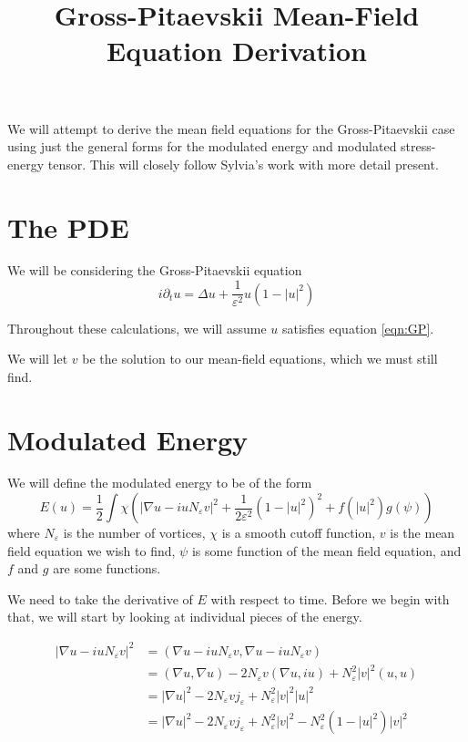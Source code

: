 \documentclass[a4paper]{article}
\title{Gross-Pitaevskii Mean-Field Equation Derivation}
\date{}
\author{}
\begin{document}
\maketitle
We will attempt to derive the mean field equations for the Gross-Pitaevskii case using just the general forms for the modulated energy and modulated
stress-energy tensor. This will closely follow Sylvia's work with more detail present.

\section{The PDE}
We will be considering the Gross-Pitaevskii equation
\begin{equation} \label{eqn:GP}
  i \partial_t u = \Delta u + \frac{1}{\varepsilon^2} u (1-|u|^2)
\end{equation}

Throughout these calculations, we will assume $u$ satisfies equation \eqref{eqn:GP}.

We will let $v$ be the solution to our mean-field equations, which we must still find.

\section{Modulated Energy}
We will define the modulated energy to be of the form
\begin{equation} \label{eqn:mod_energy_form}
  E(u) = \frac{1}{2} \int \chi \left( |\nabla u - i uN_\varepsilon v|^2 + \frac{1}{2\varepsilon^2} (1-|u|^2)^2 + f(|u|^2) g(\psi) \right)
\end{equation}
where $N_\varepsilon$ is the number of vortices, $\chi$ is a smooth cutoff function, $v$ is the mean field equation we wish to find, $\psi$ is some
function of the mean field equation, and $f$ and $g$ are some functions.

We need to take the derivative of $E$ with respect to time. Before we begin with that, we will start by looking at individual pieces of the energy.

\begin{align}
  | \nabla u - i u N_\varepsilon v|^2 &= (\nabla u - i u N_\varepsilon v, \nabla u - i u N_\varepsilon v) \nonumber \\
  &= (\nabla u, \nabla u) - 2N_\varepsilon v ( \nabla u, iu ) + N_\varepsilon^2 |v|^2 (u,u) \nonumber \\
  &= |\nabla u|^2 - 2 N_\varepsilon v j_\varepsilon + N_\varepsilon^2 |v|^2 |u|^2 \nonumber \\
  &= |\nabla u|^2 - 2N_\varepsilon v j_\varepsilon + N_\varepsilon^2 |v|^2 - N_\varepsilon^2 (1 - |u|^2)|v|^2
  \label{eqn:mod_grad}
\end{align}
\end{document}
